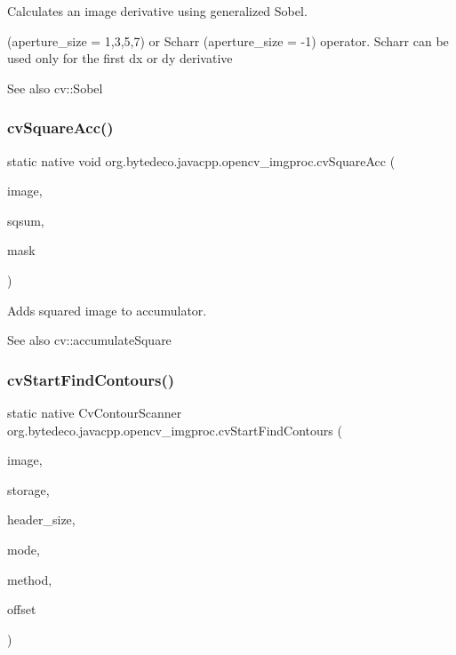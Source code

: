 Calculates an image derivative using generalized Sobel. 

(aperture\+\_\+size = 1,3,5,7) or Scharr (aperture\+\_\+size = -\/1) operator. Scharr can be used only for the first dx or dy derivative \begin{DoxySeeAlso}{See also}
cv\+::\+Sobel 
\end{DoxySeeAlso}
\mbox{\label{group__imgproc__c_ga8c1d632da04d1ddc6e38b712f03adbe8}} 
\subsubsection{\texorpdfstring{cv\+Square\+Acc()}{cvSquareAcc()}}
{\footnotesize\ttfamily static native void org.\+bytedeco.\+javacpp.\+opencv\+\_\+imgproc.\+cv\+Square\+Acc (\begin{DoxyParamCaption}\item[{@Const Cv\+Arr}]{image,  }\item[{Cv\+Arr}]{sqsum,  }\item[{@Const Cv\+Arr}]{mask }\end{DoxyParamCaption})\hspace{0.3cm}{\ttfamily [static]}}



Adds squared image to accumulator. 

\begin{DoxySeeAlso}{See also}
cv\+::accumulate\+Square 
\end{DoxySeeAlso}
\mbox{\label{group__imgproc__c_ga17ceae2468b1b23ece917fb982a377ff}} 
\subsubsection{\texorpdfstring{cv\+Start\+Find\+Contours()}{cvStartFindContours()}}
{\footnotesize\ttfamily static native Cv\+Contour\+Scanner org.\+bytedeco.\+javacpp.\+opencv\+\_\+imgproc.\+cv\+Start\+Find\+Contours (\begin{DoxyParamCaption}\item[{Cv\+Arr}]{image,  }\item[{Cv\+Mem\+Storage}]{storage,  }\item[{int}]{header\+\_\+size,  }\item[{int}]{mode,  }\item[{int}]{method,  }\item[{@By\+Val(null\+Value=\char`\"{}Cv\+fr.antproject.utils.Point(cv\+fr.antproject.utils.Point(0,0))\char`\"{}) Cv\+fr.antproject.utils.Point}]{offset }\end{DoxyParamCaption})\hspace{0.3cm}{\ttfamily [static]}}



